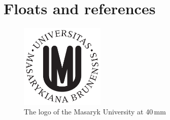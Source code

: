 \documentclass[
  digital, %
  oneside, %
  table,   %
  lof,     %
  lot,     %
]{fithesis3}
\begin{document}
\chapter{Floats and references}
\begin{figure}
  \begin{center}
    \includegraphics[width=4cm]{fithesis/logo/mu/fithesis-base.pdf}
  \end{center}
  \caption{The logo of the Masaryk University at 40\,mm}
  \label{fig:mulogo1}
\end{figure}
\end{document}
